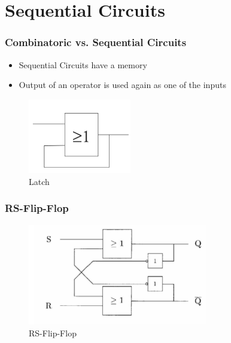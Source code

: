 \documentclass{beamer}
\begin{document}
\section{Sequential Circuits}

\begin{frame}\frametitle{Combinatoric vs. Sequential Circuits}
\begin{itemize}
 \item Sequential Circuits have a memory
 \item Output of an operator is used again as one of the inputs
\end{itemize}


\begin{figure}[H]
\centering
  \includegraphics[width=0.4\textwidth]{loop}%
  \caption{Latch}%
  \label{fig:loop}
\end{figure}
\end{frame}

\begin{frame}\frametitle{RS-Flip-Flop}
\begin{figure}[H]
\centering
  \includegraphics[width=0.7\textwidth]{RSFF}%
  \caption{RS-Flip-Flop}%
  \label{fig:RSFF}
\end{figure}
\end{frame}
\end{document}
